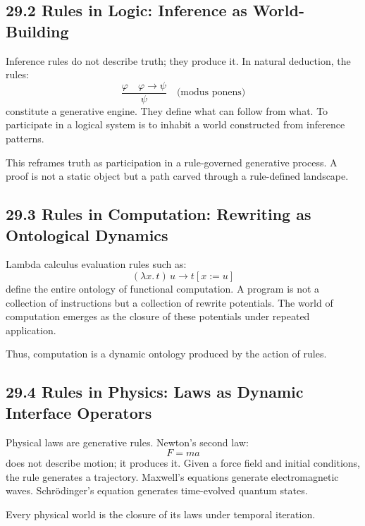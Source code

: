 \documentclass[12pt,letterpaper]{article}
\theoremstyle{remark}
\begin{document}
\subsection{29.2 Rules in Logic: Inference as World-Building}

Inference rules do not describe truth; they produce it. In natural deduction, the rules:
\[
\frac{\varphi \quad \varphi \to \psi}{\psi}
\quad\text{(modus ponens)}
\]
constitute a generative engine. They define what can follow from what. To participate in a logical system is to inhabit a world constructed from inference patterns.

This reframes truth as participation in a rule-governed generative process. A proof is not a static object but a path carved through a rule-defined landscape.

\subsection{29.3 Rules in Computation: Rewriting as Ontological Dynamics}

Lambda calculus evaluation rules such as:
\[
(\lambda x.\, t)\, u \to t[x := u]
\]
define the entire ontology of functional computation. A program is not a collection of instructions but a collection of rewrite potentials. The world of computation emerges as the closure of these potentials under repeated application.

Thus, computation is a dynamic ontology produced by the action of rules.

\subsection{29.4 Rules in Physics: Laws as Dynamic Interface Operators}

Physical laws are generative rules. Newton’s second law:
\[
F = ma
\]
does not describe motion; it produces it. Given a force field and initial conditions, the rule generates a trajectory. Maxwell’s equations generate electromagnetic waves. Schrödinger’s equation generates time-evolved quantum states.

Every physical world is the closure of its laws under temporal iteration.
\end{document}
